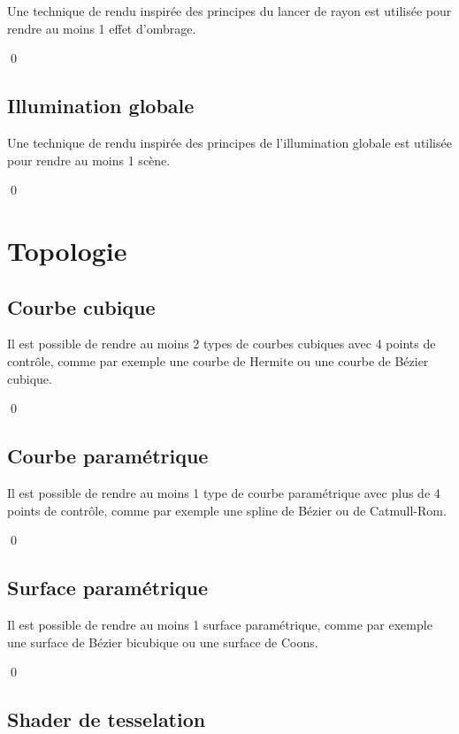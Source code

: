 \documentclass[12pt]{article}
\newcommand{\state}{\noindent}
\begin{document}
\state
Une technique de rendu inspirée des principes du lancer de rayon est utilisée pour rendre au moins 1 effet d'ombrage.

\qed

\subsection{Illumination globale}

\state
Une technique de rendu inspirée des principes de l'illumination globale est utilisée pour rendre au moins 1 scène.

\qed

\pagebreak

\section{Topologie}

\subsection{Courbe cubique}

\state
Il est possible de rendre au moins 2 types de courbes cubiques avec 4 points de contrôle, comme par exemple une courbe de Hermite ou une courbe de Bézier cubique.

\qed

\subsection{Courbe paramétrique}

\state
Il est possible de rendre au moins 1 type de courbe paramétrique avec plus de 4 points de contrôle, comme par exemple une spline de Bézier ou de Catmull-Rom.

\qed

\subsection{Surface paramétrique}

\state
Il est possible de rendre au moins 1 surface paramétrique, comme par exemple une surface de Bézier bicubique ou une surface de Coons.

\qed

\subsection{Shader de tesselation}
\end{document}

